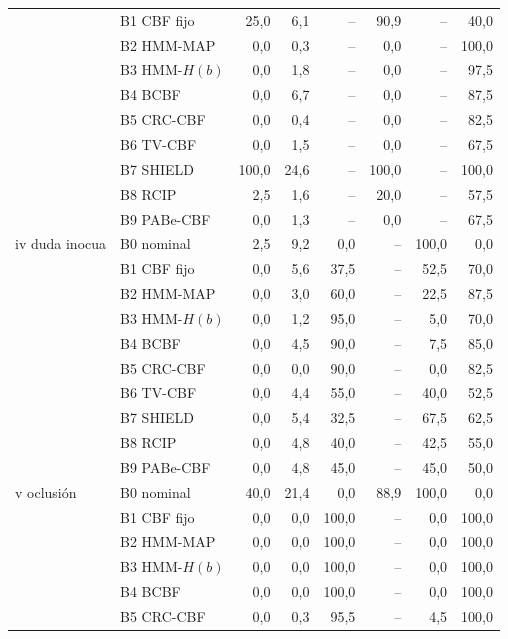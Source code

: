 \begin{table}[!t]
{\begin{tabular}{llrrrrrr}
 & B1 CBF fijo & 25{,}0 & 6{,}1 & -- & 90{,}9 & -- & 40{,}0 \\
 & B2 HMM-MAP & 0{,}0 & 0{,}3 & -- & 0{,}0 & -- & 100{,}0 \\
 & B3 HMM-$H(b)$ & 0{,}0 & 1{,}8 & -- & 0{,}0 & -- & 97{,}5 \\
 & B4 BCBF & 0{,}0 & 6{,}7 & -- & 0{,}0 & -- & 87{,}5 \\
 & B5 CRC-CBF & 0{,}0 & 0{,}4 & -- & 0{,}0 & -- & 82{,}5 \\
 & B6 TV-CBF & 0{,}0 & 1{,}5 & -- & 0{,}0 & -- & 67{,}5 \\
 & B7 SHIELD & 100{,}0 & 24{,}6 & -- & 100{,}0 & -- & 100{,}0 \\
 & B8 RCIP & 2{,}5 & 1{,}6 & -- & 20{,}0 & -- & 57{,}5 \\
 & B9 PABe-CBF & 0{,}0 & 1{,}3 & -- & 0{,}0 & -- & 67{,}5 \\
\midrule
iv duda inocua & B0 nominal & 2{,}5 & 9{,}2 & 0{,}0 & -- & 100{,}0 & 0{,}0 \\
 & B1 CBF fijo & 0{,}0 & 5{,}6 & 37{,}5 & -- & 52{,}5 & 70{,}0 \\
 & B2 HMM-MAP & 0{,}0 & 3{,}0 & 60{,}0 & -- & 22{,}5 & 87{,}5 \\
 & B3 HMM-$H(b)$ & 0{,}0 & 1{,}2 & 95{,}0 & -- & 5{,}0 & 70{,}0 \\
 & B4 BCBF & 0{,}0 & 4{,}5 & 90{,}0 & -- & 7{,}5 & 85{,}0 \\
 & B5 CRC-CBF & 0{,}0 & 0{,}0 & 90{,}0 & -- & 0{,}0 & 82{,}5 \\
 & B6 TV-CBF & 0{,}0 & 4{,}4 & 55{,}0 & -- & 40{,}0 & 52{,}5 \\
 & B7 SHIELD & 0{,}0 & 5{,}4 & 32{,}5 & -- & 67{,}5 & 62{,}5 \\
 & B8 RCIP & 0{,}0 & 4{,}8 & 40{,}0 & -- & 42{,}5 & 55{,}0 \\
 & B9 PABe-CBF & 0{,}0 & 4{,}8 & 45{,}0 & -- & 45{,}0 & 50{,}0 \\
\midrule
v oclusión & B0 nominal & 40{,}0 & 21{,}4 & 0{,}0 & 88{,}9 & 100{,}0 & 0{,}0 \\
 & B1 CBF fijo & 0{,}0 & 0{,}0 & 100{,}0 & -- & 0{,}0 & 100{,}0 \\
 & B2 HMM-MAP & 0{,}0 & 0{,}0 & 100{,}0 & -- & 0{,}0 & 100{,}0 \\
 & B3 HMM-$H(b)$ & 0{,}0 & 0{,}0 & 100{,}0 & -- & 0{,}0 & 100{,}0 \\
 & B4 BCBF & 0{,}0 & 0{,}0 & 100{,}0 & -- & 0{,}0 & 100{,}0 \\
 & B5 CRC-CBF & 0{,}0 & 0{,}3 & 95{,}5 & -- & 4{,}5 & 100{,}0 \\

\end{tabular}}
\end{table}

